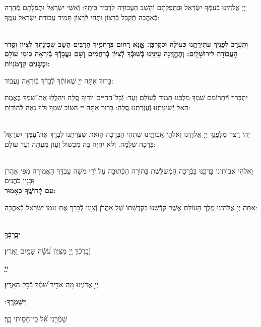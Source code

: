 \documentclass[twoside, openany, parskip=half, 11pt]{book}
\begin{document}
\begin{sometimes}
 יְיָ אֱלֹהֵֽינוּ בְּֿעַמְּֿךָ יִשְׂרָאֵל וּבִתְפִלָּתָם וְֿהָשֵׁב הָעֲבוֹדָה לִדְבִיר בֵּיתֶֽךָ: וְֿאִשֵּׁי יִשְׂרָאֵל וּתְפִלָּתָם מְֿהֵרָה בְּֿאַהֲבָה תְֿקַבֵּל בְּֿרָצוֹן וּתְהִי לְֿרָצוֹן תָּמִיד עֲבוֹדַת יִשְׂרָאֵל עַמֶּֽךָ:

\chazzanvkahal \\
\textbf{
וְתֶעֱרַב לְֿפָנֶֽיךָ עֲתִירָתֵֽנוּ כְּֿעוֹלָה וּכְקָרְבָּן:
אׇׇׇׇָנָּא רַחוּם בְּֿרַחֲמֶֽיךָ הָרַבִּים הָשֵׁב שְֿׁכִינָתְֿךָ לְֿצִיּוֹן וְֿסֵֽדֶר הָעֲבוֹדָה לִירוּשָׁלָֽיִם:
וְתֶחֱזֶֽינָה עֵינֵֽינוּ בְּֿשׁוּבְֿךָ לְֿצִיּוֹן בְּֿרַחֲמִים
וְשָׁם נַעֲבָדְֿךָ בְּֿיִרְאָה כִּימֵי עוֹלָם וּכְשָׁנִים קַדְמֹנִיּוֹת:
}

\chazzan
בָּרוּךְ אַתָּה יְיָ שֶׁאוֹתְֿךָ לְֿבַדְּֿךָ בְּֿיִרְאָה נַעֲבוֹד:

\modim

 יִתְבָּרַךְ וְֿיִתְרוֹמַם שִׁמְךָ מַלְכֵּֽנוּ תָּמִיד לְֿעוֹלָם וָעֶד: וְֿכׇל־הַחַיִּים יוֹדֽוּךָ סֶּֽלָה וִיהַלֲלוּ אֶת־שִׁמְךָ בֶּאֱמֶת הָאֵל יְֿשׁוּעָתֵֽנוּ וְֿעֶזְרָתֵֽנוּ סֶֽלָה: בָּרוּךְ אַתָּה יְיָ הַטּוֹב שִׁמְךָ וּלְךָ נָאֶה לְֿהוֹדוֹת:

\\
יְהִי רָצוׂן מִלְּֿפָנֶֽךָ יְיָ אֱלֹהֵֽינוּ וֵאלֹהֵי אֲבוׂתֵֽינוּ שֶׁתְּֿהִי הַבְּֿרָכָה הַזֹּאת שֶׁצִּוִּיתָנוּ לְֿבָרֵךְ אֶת־עַמְּֿךָ יִשׂרָאֵל בְּֿרָכָה שְֿׁלֵמָה. וְֿלֹא יִהְיֶה בָּה מִכְשׁוֹל וְֿעָוׂן מֵעַתָּה וְֿעַד עוׂלָם:

\\
\shatz {}
 וֵאלֹהֵי אֲבוֹתֵֽינוּ בָּרֲכֵֽנוּ בַּבְּֿרָכָה הַמְֿשֻׁלֶּֽשֶׁת בַּתּוֹרָה הַכְּֿתוּבָה עַל יְֿדֵי מֹשֶׁה עַבְדֶּֽךָ הָאֲמוּרָה מִפִּי אַהֲרֹן וּבָנָיו כֹּהֲנִים \\
 \shatzvkahal
\textbf{עַם קְֿדוֹשֶֽׁךָ כָּאָמוּר:}

 אַתָּה יְיָ אֱלֹהֵֽינוּ מֶֽלֶךְ הָעוֹלָם אֲשֶׁר קִדְּֿשָֽׁנוּ בִּקְדֻשָּׁתוֹ שֶׁל אַהֲרֹן וְֿצִוָּֽנוּ לְֿבָרֵךְ אֶת־עַמּוֹ יִשְׂרָאֵל בְּֿאַהֲבָה:


\\
\textbf{יְבָֽרֶכְֿךָ֥}
 \hfill \begin{footnotesize}
  יְֿבָֽרֶכְֿךָ֣ יְ֖יָ מִצִּיּ֑וֹן עֹ֝שֵׂ֗ה שָׁמַ֥יִם וָאָֽרֶץ׃\\
 \end{footnotesize}
\textbf{יְיָ֖}
 \hfill \begin{footnotesize}
 יְיָ֥ אֲדֹנֵ֑ינוּ מָֽה־אַדִּ֥יר שִׁ֝מְ֗ךָ בְּֿכׇל־הָאָֽרֶץ׃\\
 \end{footnotesize}
\textbf{וְיִשְׁמְרֶֽךָ}
׃ \hfill \begin{footnotesize}
 שָׁמְֿרֵ֥נִי אֵ֝֗ל כִּֽי־חָסִ֥יתִי בָֽךְ׃
\end{footnotesize}


\end{sometimes}
\end{document}
